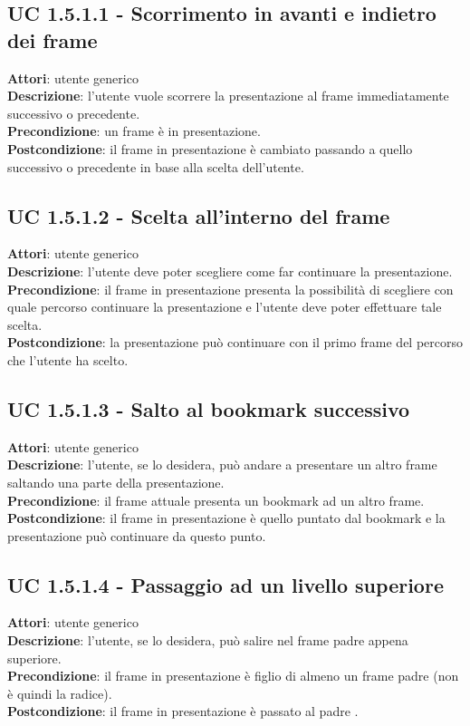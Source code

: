 	\subsection{UC 1.5.1.1 - Scorrimento in avanti e indietro dei frame}{
		\label{uc1.5.1.1}
		\textbf{Attori}: utente generico \\
		\textbf{Descrizione}: l'utente vuole scorrere la presentazione al frame immediatamente successivo o precedente. \\
		\textbf{Precondizione}: un frame è in presentazione.	\\
		\textbf{Postcondizione}: il frame in presentazione è cambiato passando a quello successivo o precedente in base alla scelta dell'utente.	\\
	}
	\subsection{UC 1.5.1.2 - Scelta all'interno del frame}{
		\label{uc1.5.1.2}
		\textbf{Attori}: utente generico \\
		\textbf{Descrizione}: l'utente deve poter scegliere come far continuare la presentazione. \\
		\textbf{Precondizione}: il frame in presentazione presenta la possibilità di scegliere con quale percorso continuare la presentazione e l'utente deve poter effettuare tale scelta.	\\
		\textbf{Postcondizione}: la presentazione può continuare con il primo frame del percorso che l'utente ha scelto.	\\
	}
	\subsection{UC 1.5.1.3 - Salto al bookmark successivo}{
		\label{uc1.5.1.3}
		\textbf{Attori}: utente generico \\
		\textbf{Descrizione}: l'utente, se lo desidera, può andare a presentare un altro frame saltando una parte della presentazione. \\
		\textbf{Precondizione}: il frame attuale presenta un bookmark ad un altro frame.	\\
		\textbf{Postcondizione}: il frame in presentazione è quello puntato dal bookmark e la presentazione può continuare da questo punto.	\\
	}
	\subsection{UC 1.5.1.4 - Passaggio ad un livello superiore}{
		\label{uc1.5.1.4}
		\textbf{Attori}: utente generico \\
		\textbf{Descrizione}: l'utente, se lo desidera, può salire nel frame padre appena superiore. \\
		\textbf{Precondizione}: il frame in presentazione è figlio di almeno un frame padre (non è quindi la radice).	\\
		\textbf{Postcondizione}: il frame in presentazione è passato al padre .	\\
	}
